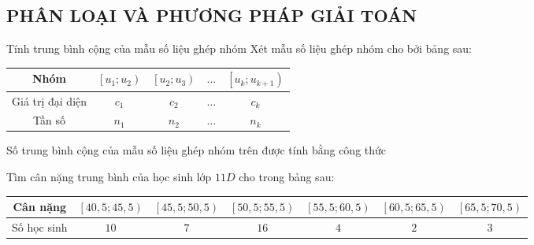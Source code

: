 \subsection{PHÂN LOẠI VÀ PHƯƠNG PHÁP GIẢI TOÁN}
\begin{dang}{Tính trung bình cộng của mẫu số liệu ghép nhóm}
	Xét mẫu số liệu ghép nhóm cho bởi bảng sau:
	\begin{center}
		\begin{tabular}{|c|c|c|c|c|}
			\hline Nhóm             & {$\left[u_1; u_2\right)$} & {$\left[u_2; u_3\right)$} & $\ldots$ & {$\left[u_k; u_{k+1}\right)$} \\
			\hline Giá trị đại diện & $c_1$                     & $c_2$                     & $\ldots$ & $c_k$                         \\
			\hline Tần số           & $n_1$                     & $n_2$                     & $\ldots$ & $n_k$                         \\
			\hline
		\end{tabular}
	\end{center}
	Số trung bình cộng của mẫu số liệu ghép nhóm trên được tính bằng công thức
\end{dang}
\begin{vd}%
	Tìm cân nặng trung bình của học sinh lớp $11D$ cho trong bảng sau:
	\begin{center}
		\begin{tabular}{|c|c|c|c|c|c|c|}
			\hline
			Cân nặng    & $\left[40{,}5;45{,}5 \right)$ & $\left[45{,}5;50{,}5 \right)$ & $\left[50{,}5;55{,}5 \right)$ & $\left[55{,}5;60{,}5 \right)$ & $\left[60{,}5;65{,}5 \right)$ & $\left[65{,}5;70{,}5 \right)$ \\
			\hline
			Số học sinh & $10$                          & $7$                           & $16$                          & $4$                           & $2$                           & $3$                           \\
			\hline
		\end{tabular}
	\end{center}
\end{vd}
